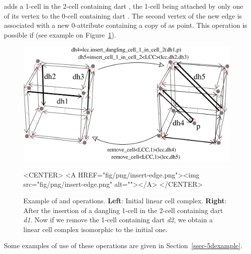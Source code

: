  adds a 1-cell in
the 2-cell containing dart , the 1-cell being attached by only
one of its vertex to the 0-cell containing dart .  The second
vertex of the new edge is associated with a new 0-attribute containing
a copy of  as point. This operation is possible if
\myin{} (see example on
Figure~\ref{fig-lcc-insert-dangling-edge}).
  \begin{figure}[htb]
    \begin{ccTexOnly}
      \begin{center}
        \includegraphics[width=.72\textwidth]{Linear_cell_complex/fig/pdf/insert-edge}
      \end{center}
    \end{ccTexOnly}
    \begin{ccHtmlOnly}
      <CENTER> <A HREF="fig/png/insert-edge.png"><img
      src="fig/png/insert-edge.png" alt=""></A> </CENTER>
    \end{ccHtmlOnly}
    \caption{Example of  and
       operations. \textbf{Left}: Initial linear
      cell complex.  \textbf{Right}: After the insertion of a dangling
      1-cell in the 2-cell containing dart \emph{d1}. Now if we remove
      the 1-cell containing dart \emph{d2}, we obtain a linear cell
      complex isomorphic to the initial one.}
    \label{fig-lcc-insert-dangling-edge}
  \end{figure}

  Some examples of use of these operations are given in
  Section~\ref{ssec-5dexample}.


